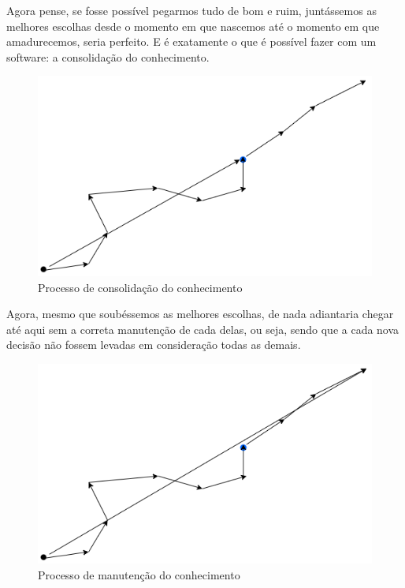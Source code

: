 \documentclass[a4paper,twoside]{article}
\begin{document}
Agora pense, se fosse possível pegarmos tudo de bom e ruim, juntássemos as melhores escolhas desde o momento em que nascemos até o momento em que amadurecemos, seria perfeito. E é exatamente o que é possível fazer com um software: a consolidação do conhecimento. 

\begin{figure}[H]
    \centering
    \includegraphics[scale=0.60,keepaspectratio=true]{images/02.png}
    \caption{Processo de consolidação do conhecimento}
    \label{knwledge_consolidation}
\end{figure}

Agora, mesmo que soubéssemos as melhores escolhas, de nada adiantaria chegar até aqui sem a correta manutenção de cada delas, ou seja, sendo que a cada nova decisão não fossem levadas em consideração todas as demais.

\begin{figure}[H]
    \centering
    \includegraphics[scale=0.60,keepaspectratio=true]{images/03.png}
    \caption{Processo de manutenção do conhecimento}
    \label{knowledge_maintenance}
\end{figure}
\end{document}
